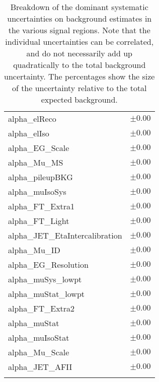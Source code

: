 \begin{table}
\begin{center}
\begin{tabular*}{\textwidth}{@{\extracolsep{\fill}}lc}
alpha\_elReco         & $\pm 0.00$       \\
alpha\_elIso         & $\pm 0.00$       \\
alpha\_EG\_Scale         & $\pm 0.00$       \\
alpha\_Mu\_MS         & $\pm 0.00$       \\
alpha\_pileupBKG         & $\pm 0.00$       \\
alpha\_muIsoSys         & $\pm 0.00$       \\
alpha\_FT\_Extra1         & $\pm 0.00$       \\
alpha\_FT\_Light         & $\pm 0.00$       \\
alpha\_JET\_EtaIntercalibration         & $\pm 0.00$       \\
alpha\_Mu\_ID         & $\pm 0.00$       \\
alpha\_EG\_Resolution         & $\pm 0.00$       \\
alpha\_muSys\_lowpt         & $\pm 0.00$       \\
alpha\_muStat\_lowpt         & $\pm 0.00$       \\
alpha\_FT\_Extra2         & $\pm 0.00$       \\
alpha\_muStat         & $\pm 0.00$       \\
alpha\_muIsoStat         & $\pm 0.00$       \\
alpha\_Mu\_Scale         & $\pm 0.00$       \\
alpha\_JET\_AFII         & $\pm 0.00$       \\
\noalign{\smallskip}\hline\noalign{\smallskip}
\end{tabular*}
\end{center}
\caption[Breakdown of uncertainty on background estimates]{
Breakdown of the dominant systematic uncertainties on background estimates in the various signal regions.
Note that the individual uncertainties can be correlated, and do not necessarily add up quadratically to 
the total background uncertainty. The percentages show the size of the uncertainty relative to the total expected background.
\label{table.results.bkgestimate.uncertainties.SRhigh}}
\end{table}
\clearpage
%